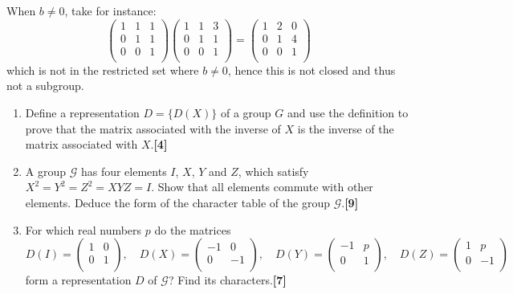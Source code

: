 \documentclass[a4paper]{article}
\begin{document}
\begin{ans}
\begin{enumerate}[label=(\alph*)]
When $b\neq 0$, take for instance:
$$\begin{pmatrix}1&1&1\\0&1&1\\0&0&1\\\end{pmatrix}\begin{pmatrix}1&1&3\\0&1&1\\0&0&1\\\end{pmatrix}=\begin{pmatrix}1&2&0\\0&1&4\\0&0&1\\\end{pmatrix}$$
which is not in the restricted set where $b\neq 0$, hence this is not closed and thus not a subgroup.
\end{enumerate}
\end{ans}
\newpage
\begin{qns}\leavevmode
\begin{enumerate}[label=(\alph*)]
\item Define a representation $D = \{D(X)\}$ of a group $G$ and use the definition to prove that the matrix associated with the inverse of $X$ is the inverse of the matrix associated with $X$.\hfill\textbf{[4]}
\item A group $\mathcal{G}$ has four elements $I$, $X$, $Y$ and $Z$, which satisfy $X^2=Y^2=Z^2=XYZ=I$. Show that all elements commute with other elements. Deduce the form of the character table of the group $\mathcal{G}$.\hfill\textbf{[9]}\item For which real numbers $p$ do the matrices
$$D(I)=\begin{pmatrix}1&0\\0&1\\\end{pmatrix},\quad D(X)=\begin{pmatrix}-1&0\\0&-1\\\end{pmatrix},\quad D(Y)=\begin{pmatrix}-1&p\\0&1\\\end{pmatrix},\quad D(Z)=\begin{pmatrix}1&p\\0&-1\\\end{pmatrix}$$
form a representation $D$ of $\mathcal{G}$? Find its characters.\hfill\textbf{[7]}
\end{enumerate}
\end{qns}
\end{document}
